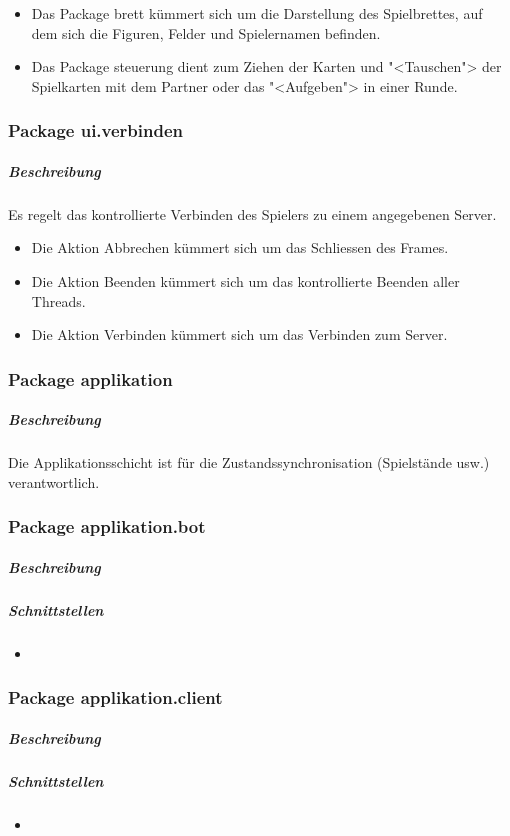 \documentclass[12pt,halfparskip]{scrartcl}
\begin{document}
\begin{itemize}
	\item Das Package brett kümmert sich um die Darstellung des Spielbrettes, auf dem sich die Figuren, Felder und Spielernamen befinden.
	\item Das Package steuerung dient zum Ziehen der Karten und "<Tauschen"> der Spielkarten mit dem Partner oder das "<Aufgeben"> in einer Runde.
\end{itemize}

\subsubsection{Package ui.verbinden}
\label{ssub:package_ui_verbinden}
\subparagraph{Beschreibung}
Es regelt das kontrollierte Verbinden des Spielers zu einem angegebenen Server.

\begin{itemize}
	\item Die Aktion Abbrechen kümmert sich um das Schliessen des Frames.
	\item Die Aktion Beenden kümmert sich um das kontrollierte Beenden aller Threads.
	\item Die Aktion Verbinden kümmert sich um das Verbinden zum Server.
\end{itemize}

\clearpage
\subsubsection{Package applikation}
	\subparagraph{Beschreibung}
	Die Applikationsschicht ist für die Zustandssynchronisation (Spielstände usw.) verantwortlich.

\subsubsection{Package applikation.bot}
	\subparagraph{Beschreibung}

	\subparagraph{Schnittstellen}
	\begin{itemize}
		\item 
	\end{itemize}
	
\subsubsection{Package applikation.client}
	\subparagraph{Beschreibung}

	\subparagraph{Schnittstellen}
	\begin{itemize}
		\item 
	\end{itemize}
	
\end{document}
